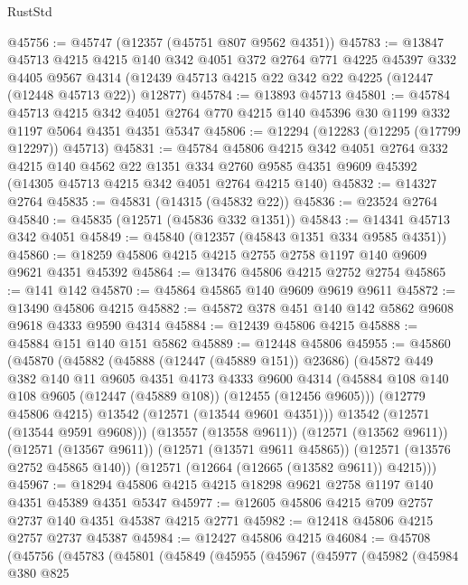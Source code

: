 \begin{lexlean}{RustStd}
\begin{coremodule}
@45756 := @45747 (@12357 (@45751 @807 @9562 @4351))
@45783 := @13847
    @45713
    @4215
    @4215
    @140
    @342
    @4051
    @372
    @2764
    @771
    @4225
    @45397
    @332
    @4405
    @9567
    @4314
    (@12439 @45713 @4215 @22 @342 @22 @4225 (@12447 (@12448 @45713 @22)) @12877)
@45784 := @13893 @45713
@45801 := @45784
    @45713
    @4215
    @342
    @4051
    @2764
    @770
    @4215
    @140
    @45396
    @30
    @1199
    @332
    @1197
    @5064
    @4351
    @4351
    @5347
@45806 := @12294 (@12283 (@12295 (@17799 @12297)) @45713)
@45831 := @45784
    @45806
    @4215
    @342
    @4051
    @2764
    @332
    @4215
    @140
    @4562
    @22
    @1351
    @334
    @2760
    @9585
    @4351
    @9609
    @45392
    (@14305 @45713 @4215 @342 @4051 @2764 @4215 @140)
@45832 := @14327 @2764
@45835 := @45831 (@14315 (@45832 @22))
@45836 := @23524 @2764
@45840 := @45835 (@12571 (@45836 @332 @1351))
@45843 := @14341 @45713 @342 @4051
@45849 := @45840 (@12357 (@45843 @1351 @334 @9585 @4351))
@45860 := @18259 @45806 @4215 @4215 @2755 @2758 @1197 @140 @9609 @9621 @4351 @45392
@45864 := @13476 @45806 @4215 @2752 @2754
@45865 := @141 @142
@45870 := @45864 @45865 @140 @9609 @9619 @9611
@45872 := @13490 @45806 @4215
@45882 := @45872 @378 @451 @140 @142 @5862 @9608 @9618 @4333 @9590 @4314
@45884 := @12439 @45806 @4215
@45888 := @45884 @151 @140 @151 @5862
@45889 := @12448 @45806
@45955 := @45860
    (@45870
      (@45882
        (@45888 (@12447 (@45889 @151)) @23686)
        (@45872
          @449
          @382
          @140
          @11
          @9605
          @4351
          @4173
          @4333
          @9600
          @4314
          (@45884 @108 @140 @108 @9605 (@12447 (@45889 @108)) (@12455 (@12456 @9605)))
          (@12779 @45806 @4215)
          @13542
          (@12571 (@13544 @9601 @4351)))
        @13542
        (@12571 (@13544 @9591 @9608)))
      (@13557 (@13558 @9611))
      (@12571 (@13562 @9611))
      (@12571 (@13567 @9611))
      (@12571 (@13571 @9611 @45865))
      (@12571 (@13576 @2752 @45865 @140))
      (@12571 (@12664 (@12665 (@13582 @9611)) @4215)))
@45967 := @18294 @45806 @4215 @4215 @18298 @9621 @2758 @1197 @140 @4351 @45389 @4351 @5347
@45977 := @12605 @45806 @4215 @709 @2757 @2737 @140 @4351 @45387 @4215 @2771
@45982 := @12418 @45806 @4215 @2757 @2737 @45387
@45984 := @12427 @45806 @4215
@46084 := @45708
    (@45756
      (@45783
        (@45801
          (@45849
            (@45955
              (@45967
                (@45977
                  (@45982
                    (@45984
                      @380
                      @825

\end{coremodule}
\end{lexlean}
